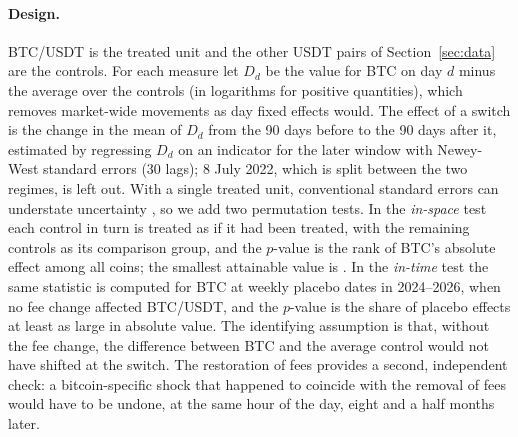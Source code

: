\paragraph{Design.} BTC/USDT is the treated unit and the \feeNcontrols{} other USDT pairs of
Section~\ref{sec:data} are the controls. For each measure let $D_d$ be the value for BTC on day $d$
minus the average over the controls (in logarithms for positive quantities), which removes
market-wide movements as day fixed effects would. The effect of a switch is the change in the mean
of $D_d$ from the 90 days before to the 90 days after it, estimated by regressing $D_d$ on an
indicator for the later window with Newey-West standard errors (30 lags); 8 July 2022, which is
split between the two regimes, is left out. With a single treated unit, conventional standard
errors can understate uncertainty \citep{conley2011}, so we add two permutation tests. In the
\emph{in-space} test each control in turn is treated as if it had been treated, with the remaining
controls as its comparison group, and the $p$-value is the rank of BTC's absolute effect among all
\panelN{} coins; the smallest attainable value is \feeMinPspace{} \citep{abadie2010}. In the
\emph{in-time} test the same statistic is computed for BTC at \feeNtime{} weekly placebo dates in
2024--2026, when no fee change affected BTC/USDT, and the $p$-value is the share of placebo effects at
least as large in absolute value. The identifying assumption is that, without the fee change, the
difference between BTC and the average control would not have shifted at the switch. The restoration
of fees provides a second, independent check: a bitcoin-specific shock that happened to coincide with
the removal of fees would have to be undone, at the same hour of the day, eight and a half months
later.

\begin{table}[t]
\centering\caption{Effects of removing and restoring fees on BTC/USDT}\label{tab:feedid}
\resizebox{\textwidth}{!}{}
\end{table}

